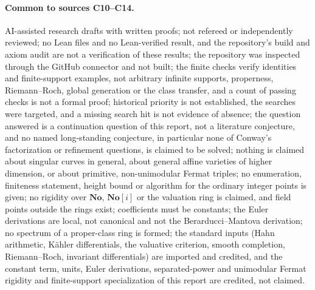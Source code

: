 \documentclass[11pt,oneside]{article}
\numberwithin{equation}{section}
\theoremstyle{definition}
\theoremstyle{remark}
\newcommand{\No}{\mathbf{No}}
\begin{document}
\paragraph{Common to sources C10--C14.} AI-assisted research drafts with written
proofs; not refereed or independently reviewed; no Lean files and no Lean-verified
result, and the repository's build and axiom audit are not a verification of these
results; the repository was inspected through the GitHub connector and not built; the
finite checks verify identities and finite-support examples, not arbitrary infinite
supports, properness, Riemann--Roch, global generation or the class transfer, and a
count of passing checks is not a formal proof; historical priority is not established,
the searches were targeted, and a missing search hit is not evidence of absence; the
question answered is a continuation question of this report, not a literature
conjecture, and no named long-standing conjecture, in particular none of Conway's
factorization or refinement questions, is claimed to be solved; nothing is claimed
about singular curves in general, about general affine varieties of higher dimension,
or about primitive, non-unimodular Fermat triples; no enumeration, finiteness
statement, height bound or algorithm for the ordinary integer points is given; no
rigidity over $\No$, $\No[i]$ or the valuation ring is claimed, and field points outside
the rings exist; coefficients must be constants; the Euler derivations are local, not
canonical and not the Berarducci--Mantova derivation; no spectrum of a proper-class
ring is formed; the standard inputs (Hahn arithmetic, K\"ahler differentials, the
valuative criterion, smooth completion, Riemann--Roch, invariant differentials) are
imported and credited, and the constant term, units, Euler derivations,
separated-power and unimodular Fermat rigidity and finite-support specialization of
this report are credited, not claimed.
\end{document}

